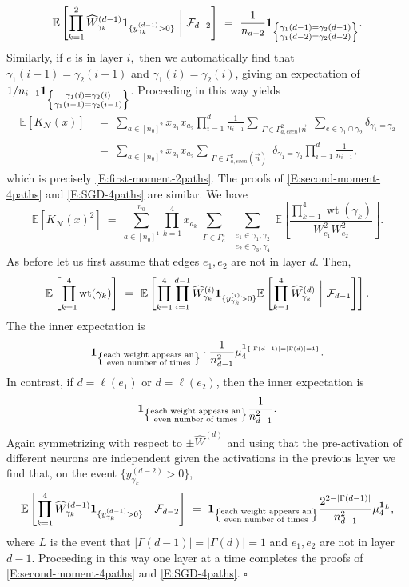 \documentclass[11pt, reqno]{amsart}
\newcommand{\E}[1]{{\mathbb E}\left [#1\right]}
\newcommand{\abs}[1]{\ensuremath{\left| #1 \right|}}
\newcommand{\set}[1]{\ensuremath{\{#1\}}}
\newcommand{\mN}{\mathcal N}
\DeclareMathOperator{\wt}{wt}
\begin{document}
\[\E{\prod_{k=1}^2\widehat{W}_{\gamma_k}^{(d-1)}{\bf 1}_{\set{y_{\gamma_k}^{(d-1)}>0}}~\bigg|~\mathcal F_{d-2}}~=~ \frac{1}{n_{d-2}}{\bf 1}_{\left\{\substack{\gamma_1(d-1)=\gamma_2(d-1)\\ \gamma_1(d-2)=\gamma_2(d-2)}\right\}}.\]
Similarly, if $e$ is in layer $i,$ then we automatically find that $\gamma_1(i-1)=\gamma_2(i-1)$ and $ \gamma_1(i)=\gamma_2(i)$, giving an expectation of $1/n_{i-1}{\bf 1}_{\left\{\substack{\gamma_1(i)=\gamma_2(i)\\ \gamma_1(i-1)=\gamma_2(i-1)}\right\}}$. Proceeding in this way yields
\begin{align*}
\E{K_{\mN}(x)}~&=~\sum_{a\in [n_0]^2}x_{a_1}x_{a_2} \prod_{i=1}^d\frac{1}{n_{i-1}}\sum_{\substack{\Gamma\in \Gamma_{a, even}^2(\vec{n}}}\sum_{e\in \gamma_1\cap \gamma_2} \delta_{\gamma_1=\gamma_2}\\
&=~\sum_{a\in [n_0]^2}x_{a_1}x_{a_2} \sum_{\substack{\Gamma\in \Gamma_{a, even}^2(\vec{n})}} \delta_{\gamma_1=\gamma_2} \prod_{i=1}^d\frac{1}{n_{i-1}},
\end{align*}
which is precisely \eqref{E:first-moment-2paths}. The proofs of \eqref{E:second-moment-4paths} and \eqref{E:SGD-4paths} are similar. We have
\[\E{K_{\mN}(x)^2}~=~\sum_{a\in [n_0]^4}^{n_0}\prod_{k=1}^4x_{a_k} \sum_{\substack{\Gamma\in \Gamma_a^4}} \sum_{\substack{e_1\in \gamma_1,\gamma_2\\ e_2\in \gamma_3,\gamma_4}} \E{\frac{ \prod_{k=1}^4\wt(\gamma_k)}{W_{e_1}^2W_{e_2}^2}}.\]
As before let us first assume that edges $e_1,e_2$ are not in layer $d$. Then, 
\[\E{\prod_{k=1}^4 \wt(\gamma_k)}~=~\E{ \prod_{k=1}^4\prod_{i=1}^{d-1}\widehat{W}_{\gamma_k}^{(i)}{\bf 1}_{\set{y_{\gamma_k}^{(i)}>0}}\E{\prod_{k=1}^4\widehat{W}_{\gamma_k}^{(d)}~\bigg|~\mathcal F_{d-1}}}.\]
The the inner expectation is
\[{\bf 1}_{\left\{\substack{\text{each weight appears an}\\\text{even number of times}}\right\}}\cdot \frac{1}{n_{d-1}^2} \mu_4^{{\bf 1}_{\set{\abs{\Gamma(d-1)}=\abs{\Gamma(d)}=1}}}.\]
In contrast, if $d=\ell(e_1)$ or $d=\ell(e_2)$, then the inner expectation is
\[
{\bf 1}_{\left\{\substack{\text{each weight appears an}\\\text{even number of times}}\right\}}\frac{1}{n_{d-1}^2}.
\]
Again symmetrizing with respect to $\pm\widehat{W}^{(d)}$ and using that the pre-activation of different neurons are independent given the activations in the previous layer we find that, on the event $\set{y_{\gamma_k}^{(d-2)}>0}$, 
\[\E{\prod_{k=1}^4\widehat{W}_{\gamma_k}^{(d-1)}{\bf 1}_{\set{y_{\gamma_k}^{(d-1)}>0}}~\bigg|~\mathcal F_{d-2}}~=~{\bf 1}_{\left\{\substack{\text{each weight appears an}\\\text{even number of times}}\right\}} \frac{2^{2-\abs{\Gamma(d-1)}}}{n_{d-1}^2} \mu_4^{{\bf 1}_{L}},\]
where $L$ is the event that $\abs{\Gamma(d-1)}=\abs{\Gamma(d)}=1$ and $e_1,e_2$ are not in layer $d-1$. Proceeding in this way one layer at a time completes the proofs of \eqref{E:second-moment-4paths} and \eqref{E:SGD-4paths}. \hfill $\square$
\end{document}
